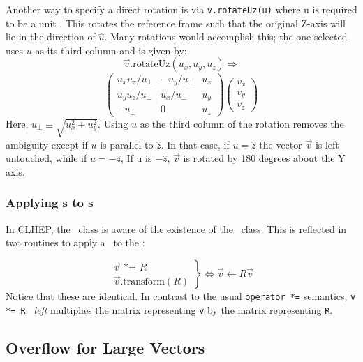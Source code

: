 Another way to specify a direct rotation is via {\tt v.rotateUz(u)}
where u is required to be a unit \SV .
This rotates the reference frame such that the original Z-axis will lie 
in the direction of $\hat{u}$.  Many rotations would accomplish this; the
one selected uses $u$ as its third column and is given by:
\[  \vec{v}.\mbox{rotateUz}(u_x, u_y, u_z)\Longrightarrow  \]
\begin{equation}
\label{eq:rotUz}
\left(
\begin{array}{ccc}
u_x u_z / u_\perp & - u_y / u_\perp & u_x \\
u_y u_z / u_\perp &   u_x / u_\perp & u_y \\
- u_\perp         &      0          & u_z
\end{array}
\right)
\left(
\begin{array}{c}
v_x\\
v_y\\
v_z
\end{array}
\right)
\end{equation}
\noindent
Here, $u_\perp \equiv \sqrt{u_x^2 + u_y^2}$.  Using $u$ as the third column of 
the rotation removes the ambiguity except if $u$ is parallel to $\hat{z}$.
In that case, if $u = \hat{z}$ the vector $\vec{v}$ is left untouched, 
while if 
$u = - \hat{z}$,
If u is $-\hat{z}$, $\vec{v}$ is rotated by 180 degrees about the Y axis.

\subsubsection{Applying \protect\Ro s to \protect\SV s}

In CLHEP, the \SV\ class is aware of the existence of the \Ro\ class.  
This is reflected in two routines to apply a \Ro\ to the \SV :

\begin{equation}
\label{eq:opstareq}
\left.
\begin{array} {r}
\vec{v} \mbox{ *= } R \\
\vec{v} \mbox{.transform} (R) 
\end{array}
\right\}
\Longleftrightarrow
\vec{v} \leftarrow R \vec{v}
\end{equation}
\noindent
Notice that these are identical.
In contrast to the usual {\tt operator *=} semantics, 
{\tt v *= R } {\it left} multiplies the matrix representing {\tt v} 
by the matrix representing {\tt R}.


\subsection{Overflow for Large Vectors}

